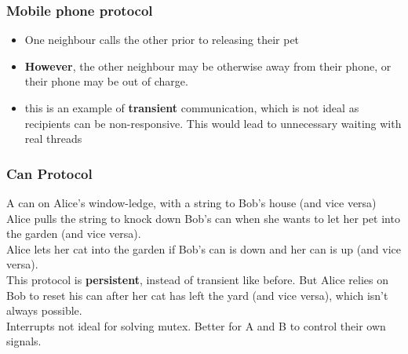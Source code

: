 \documentclass{article}
\begin{document}
\subsubsection{Mobile phone protocol}
\begin{itemize}
    \item One neighbour calls the other prior to releasing their pet
    \item \textbf{However}, the other neighbour may be otherwise away from their phone, or their phone may be out of charge. 
    \item this is an example of \textbf{transient} communication, which is not ideal as recipients can be non-responsive. This would lead to unnecessary waiting with real threads
\end{itemize}
\subsubsection{Can Protocol}
A can on Alice's window-ledge, with a string to Bob's house (and vice versa)
\\Alice pulls the string to knock down Bob's can when she wants to let her pet into the garden (and vice versa).
\\Alice lets her cat into the garden if Bob's can is down and her can is up (and vice versa).
\\This protocol is \textbf{persistent}, instead of transient like before. But Alice relies on Bob to reset his can after her cat has left the yard (and vice versa), which isn't always possible.
\\Interrupts not ideal for solving mutex. Better for A and B to control their own signals.
\end{document}
